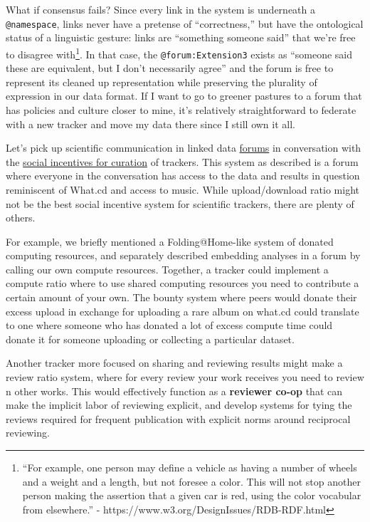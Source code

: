 \documentclass[notoc]{tufte-book}
\begin{document}
What if consensus fails? Since every link in the system is underneath a
\texttt{@namespace}, links never have a pretense of ``correctness,'' but
have the ontological status of a linguistic gesture: links are
``something someone said'' that we're free to disagree with\footnote{``For
  example, one person may define a vehicle as having a number of wheels
  and a weight and a length, but not foresee a color. This will not stop
  another person making the assertion that a given car is red, using the
  color vocabular from elsewhere.'' -
  https://www.w3.org/DesignIssues/RDB-RDF.html}. In that case, the
\texttt{@forum:Extension3} exists as ``someone said these are
equivalent, but I don't necessarily agree'' and the forum is free to
represent its cleaned up representation while preserving the plurality
of expression in our data format. If I want to go to greener pastures to
a forum that has policies and culture closer to mine, it's relatively
straightforward to federate with a new tracker and move my data there
since I still own it all.

Let's pick up scientific communication in linked data
\protect\hyperlink{forums--feeds}{forums} in conversation with the
\protect\hyperlink{archives-need-communities}{social incentives for
curation} of trackers. This system as described is a forum where
everyone in the conversation has access to the data and results in
question reminiscent of What.cd and access to music. While
upload/download ratio might not be the best social incentive system for
scientific trackers, there are plenty of others.

For example, we briefly mentioned a Folding@Home-like system of donated
computing resources, and separately described embedding analyses in a
forum by calling our own compute resources. Together, a tracker could
implement a compute ratio where to use shared computing resources you
need to contribute a certain amount of your own. The bounty system where
peers would donate their excess upload in exchange for uploading a rare
album on what.cd could translate to one where someone who has donated a
lot of excess compute time could donate it for someone uploading or
collecting a particular dataset.

Another tracker more focused on sharing and reviewing results might make
a review ratio system, where for every review your work receives you
need to review n other works. This would effectively function as a
\textbf{reviewer co-op} that can make the implicit labor of reviewing
explicit, and develop systems for tying the reviews required for
frequent publication with explicit norms around reciprocal reviewing.
\end{document}
